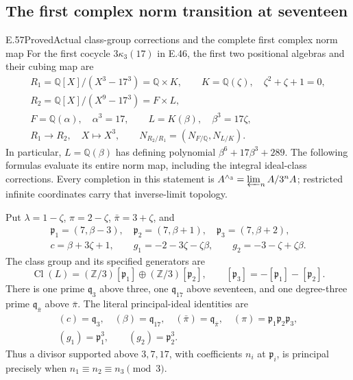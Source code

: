 \subsection{The first complex norm transition at seventeen}

\begin{statement}{E.57}{Proved}{Actual class-group corrections and the complete first complex norm map}
For the first cocycle $3\kappa_3(17)$ in E.46, the
first two positional algebras and their cubing map are
\[
 \begin{gathered}
 R_1=\mathbb Q[X]/(X^3-17^3)=\mathbb Q\times K,
                   \qquad K=\mathbb Q(\zeta),\quad\zeta^2+\zeta+1=0,\\
 R_2=\mathbb Q[X]/(X^9-17^3)=F\times L,\\
 F=\mathbb Q(\alpha),\quad\alpha^3=17,\qquad
 L=K(\beta),\quad\beta^3=17\zeta,\\
 R_1\longrightarrow R_2,\quad X\longmapsto X^3,\qquad
 N_{R_2/R_1}=(N_{F/\mathbb Q},N_{L/K}).
 \end{gathered}
 \tag{E57.1}
\]
In particular, $L=\mathbb Q(\beta)$ has defining
polynomial $\beta^6+17\beta^3+289$.
The following formulas evaluate its entire norm
map, including the integral ideal-class corrections.
Every completion in this statement is
$A^{\wedge_3}=\varprojlim_n A/3^nA$; restricted
infinite coordinates carry that inverse-limit
topology.

Put $\lambda=1-\zeta$, $\pi=2-\zeta$,
$\bar\pi=3+\zeta$, and
\[
 \begin{gathered}
 \mathfrak p_1=(7,\beta-3),\quad
 \mathfrak p_2=(7,\beta+1),\quad
 \mathfrak p_3=(7,\beta+2),\\
 c=\beta+3\zeta+1,\qquad
 g_1=-2-3\zeta-\zeta\beta,\qquad
 g_2=-3-\zeta+\zeta\beta .
 \end{gathered}
 \tag{E57.2}
\]
The class group and its specified generators are
\[
 \operatorname{Cl}(L)
   =(\mathbb Z/3)[\mathfrak p_1]
           \oplus(\mathbb Z/3)[\mathfrak p_2],
 \qquad [\mathfrak p_3]=-[\mathfrak p_1]-[\mathfrak p_2].
 \tag{E57.3}
\]
There is one prime $\mathfrak q_3$ above three,
one $\mathfrak q_{17}$ above seventeen,
and one degree-three prime $\mathfrak q_{\bar\pi}$
above $\bar\pi$. The literal principal-ideal
identities are
\[
 \begin{gathered}
 (c)=\mathfrak q_3,\quad
 (\beta)=\mathfrak q_{17},\quad
 (\bar\pi)=\mathfrak q_{\bar\pi},\quad
 (\pi)=\mathfrak p_1\mathfrak p_2\mathfrak p_3,\\
 (g_1)=\mathfrak p_1^3,\qquad
 (g_2)=\mathfrak p_2^3 .
 \end{gathered}
 \tag{E57.4}
\]
Thus a divisor supported above $3,7,17$, with
coefficients $n_i$ at $\mathfrak p_i$, is principal
precisely when
$n_1\equiv n_2\equiv n_3\pmod3$.


\end{statement}
